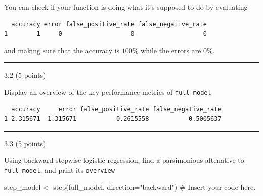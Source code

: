 \documentclass[
  letterpaper,
  DIV=11,
  numbers=noendperiod]{scrartcl}
\newenvironment{Shaded}{\begin{snugshade}}{\end{snugshade}}
\newcommand{\AttributeTok}[1]{\textcolor[rgb]{0.40,0.45,0.13}{#1}}
\newcommand{\CommentTok}[1]{\textcolor[rgb]{0.37,0.37,0.37}{#1}}
\newcommand{\FunctionTok}[1]{\textcolor[rgb]{0.28,0.35,0.67}{#1}}
\newcommand{\NormalTok}[1]{\textcolor[rgb]{0.00,0.23,0.31}{#1}}
\newcommand{\OtherTok}[1]{\textcolor[rgb]{0.00,0.23,0.31}{#1}}
\newcommand{\SpecialCharTok}[1]{\textcolor[rgb]{0.37,0.37,0.37}{#1}}
\newcommand{\StringTok}[1]{\textcolor[rgb]{0.13,0.47,0.30}{#1}}
\begin{document}
You can check if your function is doing what it's supposed to do by
evaluating

\begin{Shaded}
\end{Shaded}

\begin{verbatim}
  accuracy error false_positive_rate false_negative_rate
1        1     0                   0                   0
\end{verbatim}

and making sure that the accuracy is \(100\%\) while the errors are
\(0\%\).

\begin{center}\rule{0.5\linewidth}{0.5pt}\end{center}

3.2 (5 points)

Display an overview of the key performance metrics of
\texttt{full\_model}

\begin{Shaded}
\end{Shaded}

\begin{verbatim}
  accuracy     error false_positive_rate false_negative_rate
1 2.315671 -1.315671           0.2615558           0.5005637
\end{verbatim}

\begin{center}\rule{0.5\linewidth}{0.5pt}\end{center}

3.3 (5 points)

Using backward-stepwise logistic regression, find a parsimonious
altenative to \texttt{full\_model}, and print its \texttt{overview}

\begin{Shaded}
\begin{Highlighting}[]
\NormalTok{step\_model }\OtherTok{\textless{}{-}} \FunctionTok{step}\NormalTok{(full\_model, }\AttributeTok{direction=}\StringTok{"backward"}\NormalTok{) }\CommentTok{\# Insert your code here. }
\end{Highlighting}
\end{Shaded}
\end{document}
